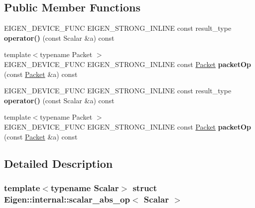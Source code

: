 \subsection*{Public Member Functions}
\begin{DoxyCompactItemize}
\item 
\mbox{\label{struct_eigen_1_1internal_1_1scalar__abs__op_a2e1557e18aea6d7b6a9b4b2cead03037}} 
E\+I\+G\+E\+N\+\_\+\+D\+E\+V\+I\+C\+E\+\_\+\+F\+U\+NC E\+I\+G\+E\+N\+\_\+\+S\+T\+R\+O\+N\+G\+\_\+\+I\+N\+L\+I\+NE const result\+\_\+type {\bfseries operator()} (const Scalar \&a) const
\item 
\mbox{\label{struct_eigen_1_1internal_1_1scalar__abs__op_a78ce4b55dd461fb7b58f7ead3544d37c}} 
{\footnotesize template$<$typename Packet $>$ }\\E\+I\+G\+E\+N\+\_\+\+D\+E\+V\+I\+C\+E\+\_\+\+F\+U\+NC E\+I\+G\+E\+N\+\_\+\+S\+T\+R\+O\+N\+G\+\_\+\+I\+N\+L\+I\+NE const \hyperlink{union_eigen_1_1internal_1_1_packet}{Packet} {\bfseries packet\+Op} (const \hyperlink{union_eigen_1_1internal_1_1_packet}{Packet} \&a) const
\item 
\mbox{\label{struct_eigen_1_1internal_1_1scalar__abs__op_a2e1557e18aea6d7b6a9b4b2cead03037}} 
E\+I\+G\+E\+N\+\_\+\+D\+E\+V\+I\+C\+E\+\_\+\+F\+U\+NC E\+I\+G\+E\+N\+\_\+\+S\+T\+R\+O\+N\+G\+\_\+\+I\+N\+L\+I\+NE const result\+\_\+type {\bfseries operator()} (const Scalar \&a) const
\item 
\mbox{\label{struct_eigen_1_1internal_1_1scalar__abs__op_a78ce4b55dd461fb7b58f7ead3544d37c}} 
{\footnotesize template$<$typename Packet $>$ }\\E\+I\+G\+E\+N\+\_\+\+D\+E\+V\+I\+C\+E\+\_\+\+F\+U\+NC E\+I\+G\+E\+N\+\_\+\+S\+T\+R\+O\+N\+G\+\_\+\+I\+N\+L\+I\+NE const \hyperlink{union_eigen_1_1internal_1_1_packet}{Packet} {\bfseries packet\+Op} (const \hyperlink{union_eigen_1_1internal_1_1_packet}{Packet} \&a) const
\end{DoxyCompactItemize}


\subsection{Detailed Description}
\subsubsection*{template$<$typename Scalar$>$\newline
struct Eigen\+::internal\+::scalar\+\_\+abs\+\_\+op$<$ Scalar $>$}



